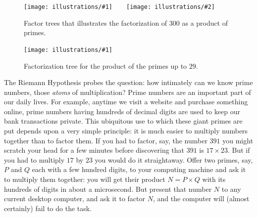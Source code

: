 \documentclass[openany]{book}
\newcommand{\ill}[3]{%
   \begin{figure}[H]%
   \vspace{-2ex}
   \centering%
   \texttt{[image: illustrations/\#1]}%
   \caption{#3}%
   \vspace{-2ex}
    \end{figure}}
\newcommand{\illtwo}[4]{%
   \begin{figure}[H]\centering%
   \texttt{[image: illustrations/\#1]}$\qquad$\texttt{[image: illustrations/\#2]}%
   \caption{#4}%
    \end{figure}}
\theoremstyle{plain}
\theoremstyle{definition}
\newcommand{\RH}{Riemann Hypothesis\index{Riemann Hypothesis}}
\begin{document}
\illtwo{factor_tree_300_a}{factor_tree_300_b}{.47}
{Factor trees that illustrates the factorization of 300 as a product of primes.\label{fig:factor300}}

\ill{factor_tree_big}{1}{Factorization tree for the product of the primes up to $29$.\label{factor.tree.big}}


The \RH{} probes the question: how intimately can we know
prime numbers, those {\em atoms} of multiplication?  Prime numbers are
an important part of our daily lives.  For example, anytime we visit a
website and purchase something online, prime numbers having hundreds of
decimal digits are used to keep our bank transactions private.  This
ubiquitous use to which these giant primes are put depends upon a very
simple principle: it is much easier to multiply numbers together than
to factor them. If you had to factor, say, the number $391$ you might
scratch your head for a few minutes before discovering that $391$ is
$17\times 23$. But if you had to multiply $17$ by $23$ you would do it
straightaway.  Offer two primes, say, $P$ and $Q$ each with a few hundred
digits, to your computing machine and ask it to multiply them
together: you will get their product $N = P\times Q$ with its hundreds of digits
in about a microsecond. But present that number $N$ to any
current desktop computer, and ask it to factor $N$, and the computer
will (almost certainly) fail to do the task.
\end{document}
